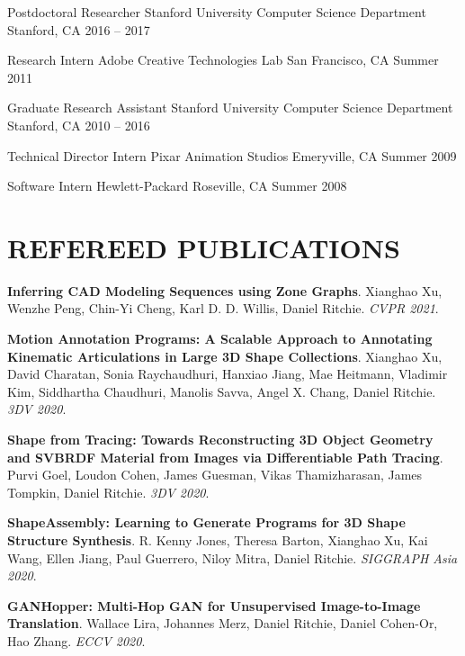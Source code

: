 \documentclass[line,margin]{res}
\begin{document}
\begin{resume}
\job
{Postdoctoral Researcher}
{Stanford University Computer Science Department}
{Stanford, CA}
{2016 -- 2017}

\job
{Research Intern}
{Adobe Creative Technologies Lab}
{San Francisco, CA}
{Summer 2011}

\job
{Graduate Research Assistant}
{Stanford University Computer Science Department}
{Stanford, CA}
{2010 -- 2016}

\job
{Technical Director Intern}
{Pixar Animation Studios}
{Emeryville, CA}
{Summer 2009}

\job
{Software Intern}
{Hewlett-Packard}
{Roseville, CA}
{Summer 2008}


\section{REFEREED PUBLICATIONS}

\newcommand{\pubtitle}[1]{\textbf{#1}}
\newcommand{\pubauthors}[1]{#1}
\newcommand{\pubvenue}[1]{\emph{#1}}
\newcommand{\pubaward}[1]{\textsc{#1}}

\pubtitle{Inferring CAD Modeling Sequences using Zone Graphs}.
\pubauthors{Xianghao Xu, Wenzhe Peng, Chin-Yi Cheng, Karl D. D. Willis, Daniel Ritchie}.
\pubvenue{CVPR 2021}.

\pubtitle{Motion Annotation Programs: A Scalable Approach to Annotating Kinematic Articulations in Large 3D Shape Collections}.
\pubauthors{Xianghao Xu, David Charatan, Sonia Raychaudhuri, Hanxiao Jiang, Mae Heitmann, Vladimir Kim, Siddhartha Chaudhuri, Manolis Savva, Angel X. Chang, Daniel Ritchie}.
\pubvenue{3DV 2020}.

\pubtitle{Shape from Tracing: Towards Reconstructing 3D Object Geometry and SVBRDF Material from Images via Differentiable Path Tracing}.
\pubauthors{Purvi Goel, Loudon Cohen, James Guesman, Vikas Thamizharasan, James Tompkin, Daniel Ritchie}.
\pubvenue{3DV 2020}.

\pubtitle{ShapeAssembly: Learning to Generate Programs for 3D Shape Structure Synthesis}.
\pubauthors{R. Kenny Jones, Theresa Barton, Xianghao Xu, Kai Wang, Ellen Jiang, Paul Guerrero, Niloy Mitra, Daniel Ritchie.}
\pubvenue{SIGGRAPH Asia 2020}.

\pubtitle{GANHopper: Multi-Hop GAN for Unsupervised Image-to-Image Translation}. 
\pubauthors{Wallace Lira, Johannes Merz, Daniel Ritchie, Daniel Cohen-Or, Hao Zhang.}
\pubvenue{ECCV 2020}.


\end{resume}
\end{document}
